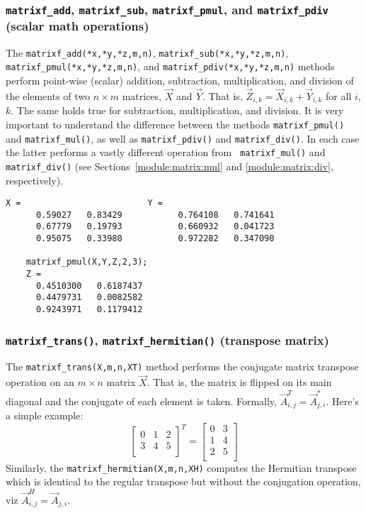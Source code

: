\subsubsection{{\tt matrixf\_add}, {\tt matrixf\_sub}, {\tt matrixf\_pmul},
and {\tt matrixf\_pdiv} (scalar math operations)}
\label{module:matrix:mathop}
The {\tt matrixf\_add(*x,*y,*z,m,n)},
    {\tt matrixf\_sub(*x,*y,*z,m,n)},
    {\tt matrixf\_pmul(*x,*y,*z,m,n)}, and
    {\tt matrixf\_pdiv(*x,*y,*z,m,n)} methods perform
point-wise (scalar) addition, subtraction, multiplication, and division
of the elements of two $n \times m$ matrices, $\vec{X}$ and $\vec{Y}$.
That is, $\vec{Z}_{i,k} = \vec{X}_{i,k} + \vec{Y}_{i,k}$ for all $i$, $k$.
The same holds true for subtraction, multiplication, and division.
It is very important to understand the difference between the methods
{\tt matrixf\_pmul()} and {\tt matrixf\_mul()}, as well as
{\tt matrixf\_pdiv()} and {\tt matrixf\_div()}.
In each case the latter performs a vastly different operation from {\tt
matrixf\_mul()} and {\tt matrixf\_div()}
(see Sections~\ref{module:matrix:mul} and \ref{module:matrix:div},
respectively).
%
\begin{Verbatim}[fontsize=\small]
    X =                         Y =
      0.59027   0.83429           0.764108   0.741641
      0.67779   0.19793           0.660932   0.041723
      0.95075   0.33980           0.972282   0.347090

    matrixf_pmul(X,Y,Z,2,3);
    Z =
      0.4510300   0.6187437
      0.4479731   0.0082582
      0.9243971   0.1179412
\end{Verbatim}
%

\subsubsection{{\tt matrixf\_trans()}, {\tt matrixf\_hermitian()} (transpose matrix)}
\label{module:matrix:trans}
The {\tt matrixf\_trans(X,m,n,XT)} method
performs the conjugate matrix transpose operation on an
$m \times n$ matrix $\vec{X}$.
That is, the matrix is flipped on its main diagonal and the conjugate of
each element is taken.
Formally, $\vec{A}^T_{i,j} = \vec{A}_{j,i}^*$.
Here's a simple example:
\[
    \left[
    \begin{array}{ccc}
    0 & 1 & 2 \\
    3 & 4 & 5 \\
    \end{array}
    \right]^T
    =
    \left[
    \begin{array}{cc}
    0 & 3 \\
    1 & 4 \\
    2 & 5 \\
    \end{array}
    \right]
\]
%
Similarly, the {\tt matrixf\_hermitian(X,m,n,XH)} computes the Hermitian
transpose which is identical to the regular transpose but without the
conjugation operation, viz
$\vec{A}^H_{i,j} = \vec{A}_{j,i}$.


